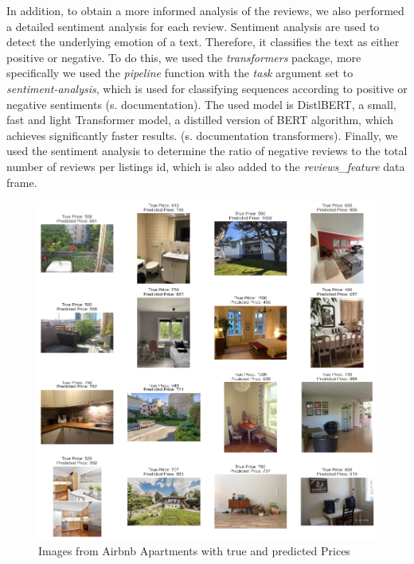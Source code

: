 \documentclass[12pt, letterpaper]{article}
\begin{document}
In addition, to obtain a more informed analysis of the reviews, we also performed a detailed sentiment analysis for each review. Sentiment analysis are used to detect the underlying emotion of a text. Therefore, it classifies the text as either positive or negative. 
To do this, we used the \textit{transformers} package, more specifically we used the \textit{pipeline} function 
with the \textit{task} argument set to \textit{sentiment-analysis}, which is used for classifying sequences
according to positive or negative sentiments (s. documentation). The used model is DistlBERT, 
a small, fast and light Transformer model, a distilled version of BERT algorithm, which achieves significantly faster results. (s. documentation transformers).
Finally, we used the sentiment analysis to determine the ratio of negative reviews to the total number of reviews per listings id, which is also added to the \textit{reviews\_feature} data frame. 




\newpage




\appendix

\begin{figure}[t]
    \centering
    \includegraphics[width=\textwidth]{cnn_examples.png}
    \caption{Images from Airbnb Apartments with true and predicted Prices}
    \label{fig:cnn-examples}
\end{figure}
\end{document}
